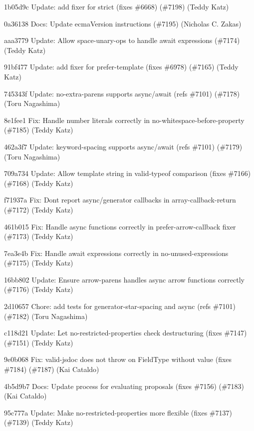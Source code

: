 \begin{DoxyItemize}
\item 1b05d9c Update\+: add fixer for {\ttfamily strict} (fixes \#6668) (\#7198) (Teddy Katz)
\item 0a36138 Docs\+: Update ecma\+Version instructions (\#7195) (Nicholas C. Zakas)
\item aaa3779 Update\+: Allow {\ttfamily space-\/unary-\/ops} to handle await expressions (\#7174) (Teddy Katz)
\item 91bf477 Update\+: add fixer for {\ttfamily prefer-\/template} (fixes \#6978) (\#7165) (Teddy Katz)
\item 745343f Update\+: {\ttfamily no-\/extra-\/parens} supports async/await (refs \#7101) (\#7178) (Toru Nagashima)
\item 8e1fee1 Fix\+: Handle number literals correctly in {\ttfamily no-\/whitespace-\/before-\/property} (\#7185) (Teddy Katz)
\item 462a3f7 Update\+: {\ttfamily keyword-\/spacing} supports async/await (refs \#7101) (\#7179) (Toru Nagashima)
\item 709a734 Update\+: Allow template string in {\ttfamily valid-\/typeof} comparison (fixes \#7166) (\#7168) (Teddy Katz)
\item f71937a Fix\+: Don\textquotesingle{}t report async/generator callbacks in {\ttfamily array-\/callback-\/return} (\#7172) (Teddy Katz)
\item 461b015 Fix\+: Handle async functions correctly in {\ttfamily prefer-\/arrow-\/callback} fixer (\#7173) (Teddy Katz)
\item 7ea3e4b Fix\+: Handle await expressions correctly in {\ttfamily no-\/unused-\/expressions} (\#7175) (Teddy Katz)
\item 16bb802 Update\+: Ensure {\ttfamily arrow-\/parens} handles async arrow functions correctly (\#7176) (Teddy Katz)
\item 2d10657 Chore\+: add tests for {\ttfamily generator-\/star-\/spacing} and async (refs \#7101) (\#7182) (Toru Nagashima)
\item c118d21 Update\+: Let {\ttfamily no-\/restricted-\/properties} check destructuring (fixes \#7147) (\#7151) (Teddy Katz)
\item 9e0b068 Fix\+: valid-\/jsdoc does not throw on Field\+Type without value (fixes \#7184) (\#7187) (Kai Cataldo)
\item 4b5d9b7 Docs\+: Update process for evaluating proposals (fixes \#7156) (\#7183) (Kai Cataldo)
\item 95c777a Update\+: Make {\ttfamily no-\/restricted-\/properties} more flexible (fixes \#7137) (\#7139) (Teddy Katz)

\end{DoxyItemize}
